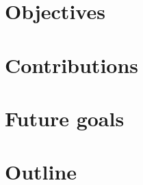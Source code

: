 \par 

\section{Objectives}

\par 

\section{Contributions}

\par 

\section{Future goals}

\par 

\par 

\section{Outline}

